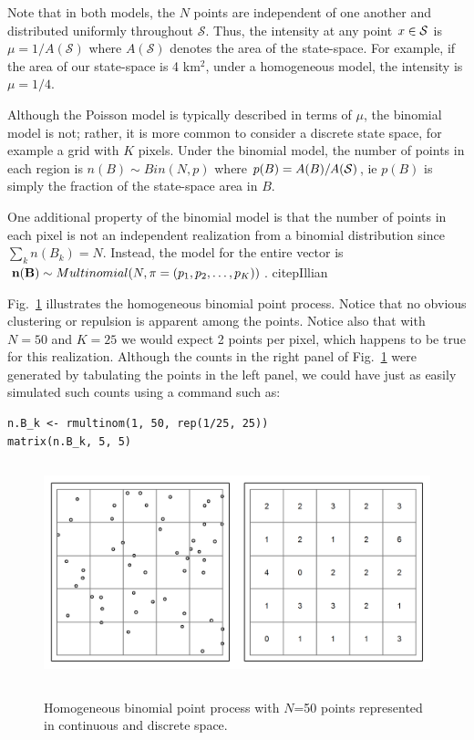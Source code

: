 Note that in both models, the $N$ points are independent
of one another and distributed uniformly
throughout $\mathcal{S}$. Thus, the intensity at any point $x \in
\cal{S}$ is $\mu = 1 / A(\mathcal{S})$ where $A(\mathcal{S})$ denotes
the area of the state-space. For example, if the area of our
state-space is 4 km$^2$,
under a homogeneous model, the intensity is $\mu = 1/4$.

Although the Poisson model is typically described in terms of $\mu$,
the binomial model is not; rather, it
is more common to consider a discrete state space, for example a grid
with $K$ pixels. Under the binomial model, the number of points in
each region is $n(B) \sim Bin(N, p)$
where $p(B) = A(B)/A(\cal{S})$, ie $p(B)$ is simply the fraction of
the state-space area in $B$.

One additional property of the binomial model is that the number of
points in each pixel is not an independent realization from a binomial
distribution since $\sum_k n(B_k) = N$. Instead, the model for the entire vector
is ${\bf n(B)} \sim Multinomial(N, {\mathbf{\pi}} = (p_1, p_2, \dots,
p_K))$. citep{Illian}

Fig.~\ref{ch9:fig:homo} illustrates the homogeneous binomial point
process. Notice that no obvious clustering or repulsion is apparent
among the points. Notice also that with $N=50$ and $K=25$ we would
expect 2 points per pixel, which happens to be true for this
realization. Although the counts in the right panel of
Fig.~\ref{ch9:fig:homo} were generated by tabulating the points in the
left panel, we could have just as easily simulated such counts using a
command such as:

\begin{verbatim}
n.B_k <- rmultinom(1, 50, rep(1/25, 25))
matrix(n.B_k, 5, 5)
\end{verbatim}


\begin{figure}
\centering
\includegraphics[width=5in,height=2.5in]{figs/homoPlots}
\label{ch9:fig:homo}
\caption{Homogeneous binomial point process with $N$=50 points
  represented in continuous and discrete space.}
\end{figure}



